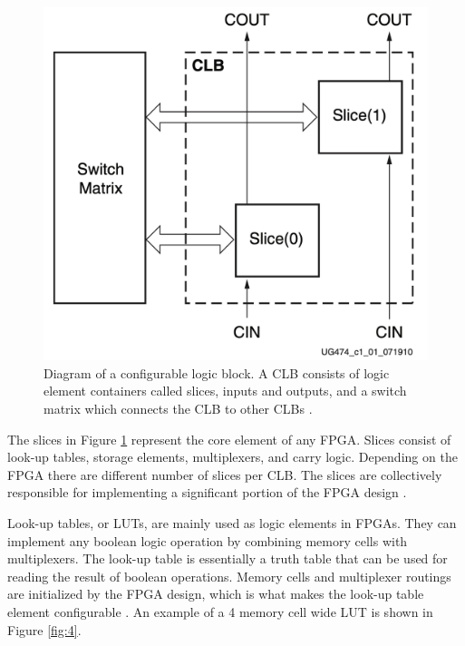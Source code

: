 \documentclass[12pt]{report}
\begin{document}
\begin{figure}[h]
    \centering
    \includegraphics[scale=0.25]{figures/clb.png}
    \caption{Diagram of a configurable logic block. A CLB consists of logic element containers called slices, inputs and outputs, and a switch matrix which connects the CLB to other CLBs \citep{XilClbMan}.}
    \label{fig:3}
\end{figure}

The slices in Figure \ref{fig:3} represent the core element of any FPGA. Slices consist of look-up tables, storage elements, multiplexers, and carry logic. Depending on the FPGA there are different number of slices per CLB. The slices are collectively responsible for implementing a significant portion of the FPGA design \citep{XilClbMan}.

Look-up tables, or LUTs, are mainly used as logic elements in FPGAs. They can implement any boolean logic operation by combining memory cells with multiplexers. The look-up table is essentially a truth table that can be used for reading the result of boolean operations. Memory cells and multiplexer routings are initialized by the FPGA design, which is what makes the look-up table element configurable \citep{XilFPGAIntro}. An example of a 4 memory cell wide LUT is shown in Figure \ref{fig:4}.
\end{document}
